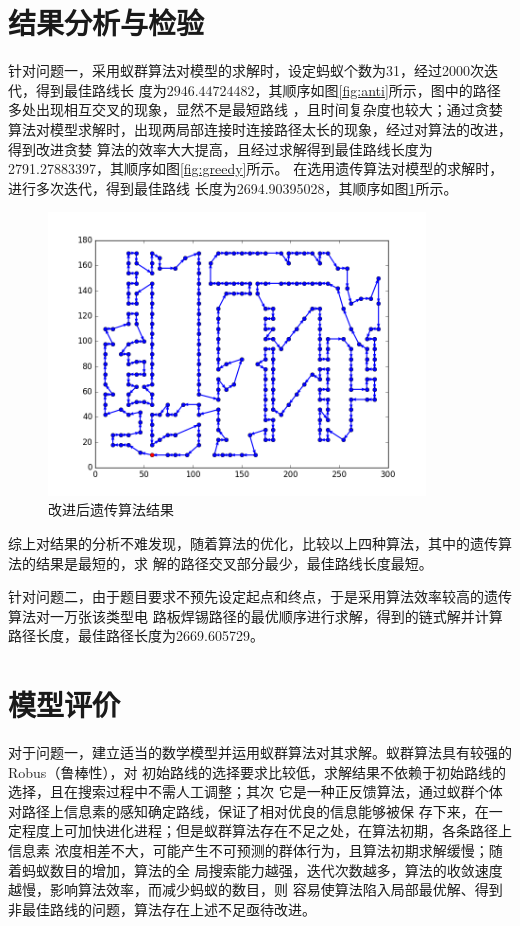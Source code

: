 \documentclass[fontset=windows,a4paper,12pt]{ctexart}
\begin{document}
    \section{结果分析与检验}
    针对问题一，采用蚁群算法对模型的求解时，设定蚂蚁个数为31，经过2000次迭代，得到最佳路线长
    度为$2946.44724482$，其顺序如图\ref{fig:anti}所示，图中的路径多处出现相互交叉的现象，显然不是最短路线
    ，且时间复杂度也较大；通过贪婪算法对模型求解时，出现两局部连接时连接路径太长的现象，经过对算法的改进，得到改进贪婪
	算法的效率大大提高，且经过求解得到最佳路线长度为2791.27883397，其顺序如图\ref{fig:greedy}所示。
	在选用遗传算法对模型的求解时，进行多次迭代，得到最佳路线
	长度为2694.90395028，其顺序如图\ref{fig:ga2}所示。
	      \begin{figure}[!htbp]
	      	\centering
	      	\includegraphics[width=10cm]{pic/ga_result2.png}
	      	\caption{改进后遗传算法结果}
	      	\label{fig:ga2}
	      \end{figure}
	综上对结果的分析不难发现，随着算法的优化，比较以上四种算法，其中的遗传算法的结果是最短的，求
	解的路径交叉部分最少，最佳路线长度最短。

	针对问题二，由于题目要求不预先设定起点和终点，于是采用算法效率较高的遗传算法对一万张该类型电
	路板焊锡路径的最优顺序进行求解，得到的链式解并计算路径长度，最佳路径长度为2669.605729。
    \section{模型评价}
	    对于问题一，建立适当的数学模型并运用蚁群算法对其求解。蚁群算法具有较强的Robus（鲁棒性），对
	    初始路线的选择要求比较低，求解结果不依赖于初始路线的选择，且在搜索过程中不需人工调整；其次
	    它是一种正反馈算法，通过蚁群个体对路径上信息素的感知确定路线，保证了相对优良的信息能够被保
	    存下来，在一定程度上可加快进化进程；但是蚁群算法存在不足之处，在算法初期，各条路径上信息素
	    浓度相差不大，可能产生不可预测的群体行为，且算法初期求解缓慢；随着蚂蚁数目的增加，算法的全
	    局搜索能力越强，迭代次数越多，算法的收敛速度越慢，影响算法效率，而减少蚂蚁的数目，则
	    容易使算法陷入局部最优解、得到非最佳路线的问题，算法存在上述不足亟待改进。
	    
\end{document}

